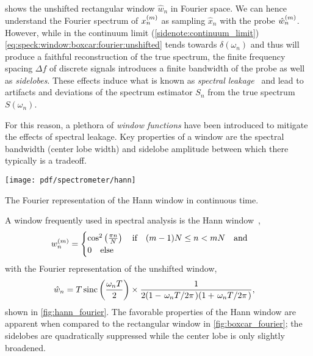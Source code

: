  shows the unshifted rectangular window $\hat{w}_n$ in Fourier space.
We can hence understand the Fourier spectrum of $x_n^{(m)}$ as sampling $\hat{x}_n$ with the probe $\hat{w}_n^{(m)}$.
However, while in the continuum limit (\cf \cref{sidenote:continuum_limit}) \cref{eq:speck:window:boxcar:fourier:unshifted} tends towards $\delta(\omega_n)$ and thus will produce a faithful reconstruction of the true spectrum, the finite frequency spacing $\Delta f$ of discrete signals introduces a finite bandwidth of the probe as well as \emph{sidelobes}.
These effects induce what is known as \emph{spectral leakage}~\cite{Harris1978,Koopmans1995} and lead to artifacts and deviations of the spectrum estimator $S_n$ from the true spectrum $S(\omega_n)$.

For this reason, a plethora of \emph{window functions} have been introduced to mitigate the effects of spectral leakage.
Key properties of a window are the spectral bandwidth (center lobe width) and sidelobe amplitude between which there typically is a tradeoff.
\begin{marginfigure}
    \centering
    \texttt{[image: pdf/spectrometer/hann]}
    \caption{The Fourier representation of the Hann window in continuous time.}
    \label{fig:hann_fourier}
\end{marginfigure}
A window frequently used in spectral analysis is the Hann window~\cite{Nuttall1981},
\begin{align}\label{eq:speck:window:hann}
    w_n\gth{m} =
    \begin{cases}
        \cos^2\left(\frac{\pi n}{N}\right)\qif (m - 1)N\leq n < mN\qand \\
        0\qelse
    \end{cases}
\end{align}
with the Fourier representation of the unshifted window,
\begin{align}\label{eq:speck:window:hann:fourier_unshifted}
    \hat{w}_n &=  T\sinc\left(\frac{\omega_n T}{2}\right)\times
                    \frac{1}{2(1 - \flatfrac{\omega_n T}{2\pi})(1 + \flatfrac{\omega_n T}{2\pi})},
\end{align}
shown in \cref{fig:hann_fourier}.
The favorable properties of the Hann window are apparent when compared to the rectangular window in \cref{fig:boxcar_fourier}; the sidelobes are quadratically suppressed while the center lobe is only slightly broadened.

